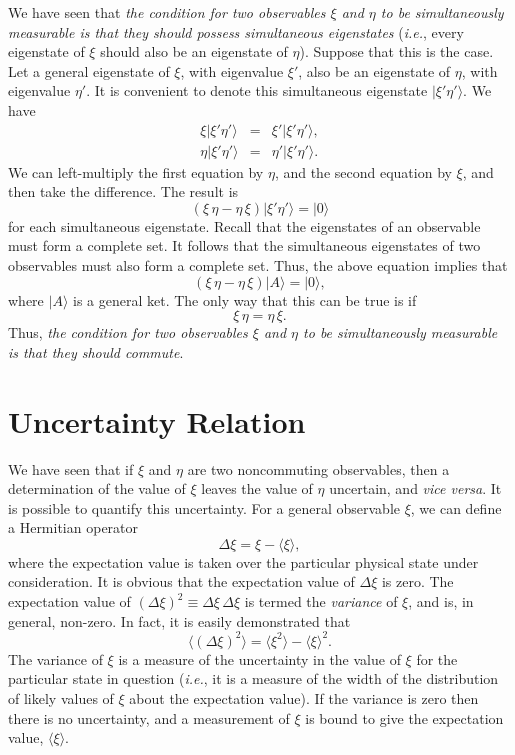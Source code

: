 We have seen that {\em the condition for two observables $\xi$ and $\eta$ to
be simultaneously measurable is that they should possess simultaneous
eigenstates} ({\em i.e.}, every eigenstate of $\xi$ should also be an eigenstate
of $\eta$). Suppose that this is the case. Let a general eigenstate of
$\xi$,  with eigenvalue $\xi'$, also be an eigenstate of
$\eta$, with eigenvalue $\eta'$. It is convenient to denote this
simultaneous eigenstate $|\xi' \eta'\rangle$. We have
\begin{eqnarray}
\xi|\xi' \eta'\rangle &=& \xi' |\xi' \eta'\rangle,\\[0.5ex]
\eta|\xi' \eta'\rangle &=& \eta'|\xi' \eta'\rangle.
\end{eqnarray}
We can left-multiply the first equation by $\eta$, and the second equation
by $\xi$, and then take the difference. The result is
\begin{equation}
(\xi\,\eta -\eta\,\xi) |\xi' \eta'\rangle = |0\rangle
\end{equation}
for each simultaneous eigenstate. 
Recall that the eigenstates of an observable must form a complete set. It follows
that the simultaneous eigenstates of two observables must also form a complete set.
Thus, the above equation implies that
\begin{equation}
(\xi\,\eta -\eta\,\xi) |A\rangle = |0\rangle,
\end{equation}
where $|A\rangle$ is a general ket. The only way that this can
be true is if
\begin{equation}
\xi\,\eta =\eta\,\xi.
\end{equation}
Thus, {\em  the condition for two observables $\xi$ and $\eta$ to be simultaneously
measurable is that they should commute}. 

\section{Uncertainty Relation}
We have seen that if $\xi$ and $\eta$ are two noncommuting observables, then
a determination of the value of $\xi$ leaves the value of $\eta$ uncertain,
and {\em vice versa}. It is possible to quantify this uncertainty. For
a general observable $\xi$, we can define a Hermitian operator
\begin{equation}
\Delta \xi = \xi - \langle \xi \rangle,
\end{equation}
where the expectation value is taken over  the particular physical state under
consideration. It is obvious that the expectation value of $\Delta \xi$ is zero.
The expectation value of $(\Delta \xi)^2 \equiv \Delta \xi\,\Delta \xi$ is termed
the {\em variance} of $\xi$, and is, in general, non-zero. In fact,
it is easily demonstrated that
\begin{equation}
\langle(\Delta \xi)^2\rangle = \langle \xi^2\rangle - \langle \xi\rangle^2.
\end{equation}
The variance of $\xi$ is a measure of the uncertainty in the value of $\xi$ for
the particular state in question ({\em i.e.}, it is a measure of the width of the 
distribution of likely values of $\xi$ about the expectation value). 
If the variance is zero then there is no uncertainty, and a measurement of $\xi$
is bound to give the expectation value, $\langle\xi\rangle$. 

